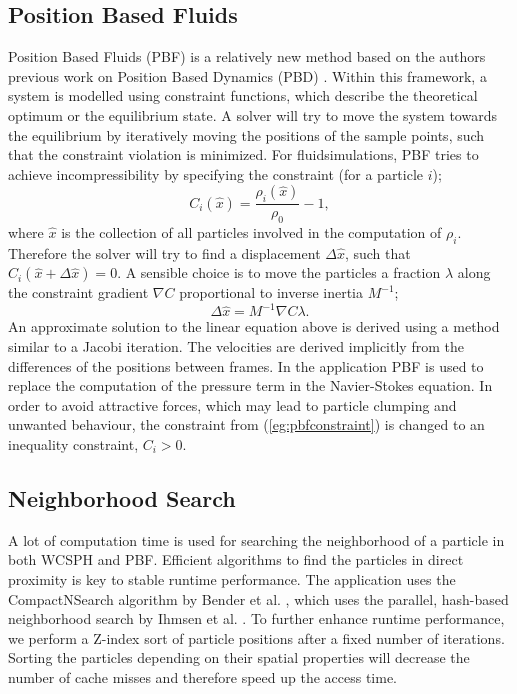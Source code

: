 \documentclass[11pt, letterpaper, twocolumn]{article}
\begin{document}
\subsection{Position Based Fluids}

Position Based Fluids (PBF) is a relatively new method based on the authors previous work on Position Based Dynamics (PBD) \cite{muller2007}.
Within this framework, a system is modelled using constraint functions, which describe the theoretical optimum or the equilibrium state. A solver will try to move the system towards the equilibrium by iteratively moving the positions of the sample points, such that the constraint violation is minimized. For fluidsimulations, PBF tries to achieve incompressibility by specifying the constraint (for a particle \(i\));
\begin{equation}
  C_i(\hat{x}) = \frac{\rho_i(\hat{x})}{\rho_0} - 1,
  \label{eg:pbfconstraint}
\end{equation}
where \(\hat{x}\) is the collection of all particles involved in the computation of \(\rho_i\). Therefore the solver will try to find a displacement \(\Delta \hat{x}\), such that \( C_i(\hat{x} + \Delta\hat{x}) = 0\). A sensible choice is to move the particles a fraction \(\lambda\) along the constraint gradient \(\nabla C\) proportional to inverse inertia \(M^{-1}\);
\begin{equation}
  \Delta\hat{x} = M^{-1} \nabla C \lambda.
  \label{eg:deltax}
\end{equation}
An approximate solution to the linear equation above is derived using a method similar to a Jacobi iteration. The velocities are derived implicitly from the differences of the positions between frames.
In the application PBF is used to replace the computation of the pressure term in the Navier-Stokes equation. In order to avoid attractive forces, which may lead to particle clumping and unwanted behaviour, the constraint from (\ref{eg:pbfconstraint}) is changed to an inequality constraint, \(C_i > 0\).

\subsection{Neighborhood Search}
A lot of computation time is used for searching the neighborhood of a particle in both WCSPH and PBF. Efficient algorithms to find the particles in direct proximity is key to stable runtime performance. The application uses the CompactNSearch algorithm by Bender et al. \cite{bender2015}, which uses the parallel, hash-based neighborhood search by Ihmsen et al. \cite{ihmsen2011}. To further enhance runtime performance, we perform a Z-index sort of particle positions after a fixed number of iterations. Sorting the particles depending on their spatial properties will decrease the number of cache misses and therefore speed up the access time.
\end{document}

